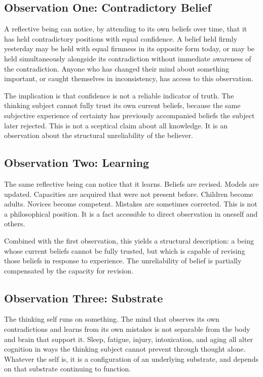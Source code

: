 \documentclass[11pt]{article}
\begin{document}
\subsection{Observation One: Contradictory Belief}

A reflective being can notice, by attending to its own beliefs over
time, that it has held contradictory positions with equal confidence.
A belief held firmly yesterday may be held with equal firmness in its
opposite form today, or may be held simultaneously alongside its
contradiction without immediate awareness of the contradiction.
Anyone who has changed their mind about something important, or
caught themselves in inconsistency, has access to this observation.

The implication is that confidence is not a reliable indicator of
truth. The thinking subject cannot fully trust its own current
beliefs, because the same subjective experience of certainty has
previously accompanied beliefs the subject later rejected. This is
not a sceptical claim about all knowledge. It is an observation
about the structural unreliability of the believer.

\subsection{Observation Two: Learning}

The same reflective being can notice that it learns. Beliefs are
revised. Models are updated. Capacities are acquired that were not
present before. Children become adults. Novices become competent.
Mistakes are sometimes corrected. This is not a philosophical
position. It is a fact accessible to direct observation in oneself
and others.

Combined with the first observation, this yields a structural
description: a being whose current beliefs cannot be fully trusted,
but which is capable of revising those beliefs in response to
experience. The unreliability of belief is partially compensated by
the capacity for revision.

\subsection{Observation Three: Substrate}

The thinking self runs on something. The mind that observes its own
contradictions and learns from its own mistakes is not separable
from the body and brain that support it. Sleep, fatigue, injury,
intoxication, and aging all alter cognition in ways the thinking
subject cannot prevent through thought alone. Whatever the self is,
it is a configuration of an underlying substrate, and depends on
that substrate continuing to function.
\end{document}
